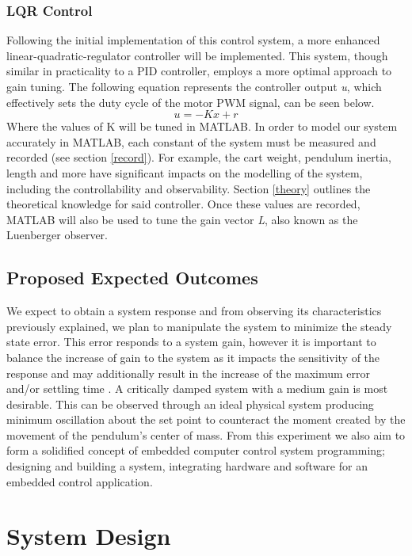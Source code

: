 \documentclass[12pt]{article}
\begin{document}
\subsubsection{LQR Control}
Following the initial implementation of this control system, a more enhanced linear-quadratic-regulator controller will be implemented. This system, though similar in practicality to a PID controller, employs a more optimal approach to gain tuning. The following equation represents the controller output \textit{u}, which effectively sets the duty cycle of the motor PWM signal, can be seen below.
\begin{equation}
    u = -Kx + r
\end{equation}
Where the values of K will be tuned in MATLAB. In order to model our system accurately in MATLAB, each constant of the system must be measured and recorded (see section \ref{record}). For example, the cart weight, pendulum inertia, length and more have significant impacts on the modelling of the system, including the controllability and observability. Section \ref{theory} outlines the theoretical knowledge for said controller. Once these values are recorded, MATLAB will also be used to tune the gain vector \textit{L}, also known as the Luenberger observer.
\subsection{Proposed Expected Outcomes}
We expect to obtain a system response and from observing its characteristics previously explained, we plan to manipulate the system to minimize the steady state error. This error  responds to a system gain, however it is important to balance the increase of gain to the system as it impacts the sensitivity of the response and may additionally result in the increase of the maximum error and/or settling time \cite{OCLoop}. A critically damped system with a medium gain is most desirable. This can be observed through an ideal physical system producing minimum oscillation about the set point to counteract the moment created by the movement of the pendulum's center of mass. From this experiment we also aim to form a solidified concept of embedded computer control system programming; designing and building a system, integrating hardware and software for an embedded control application.

\section{System Design}
\end{document}
